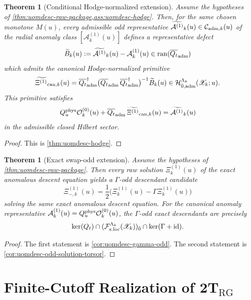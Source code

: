 \documentclass[11pt]{article}
\theoremstyle{definition}
\theoremstyle{plain}
\newtheorem{theorem}[definition]{Theorem}
\theoremstyle{remark}
\newcommand{\Fsloc}{\mathcal F_{\rm s.loc}}
\newcommand{\Xscr}{\mathscr X}
\newcommand{\Ozero}{\mathcal O^{(0)}}
\newcommand{\Aone}{\mathcal A^{(1)}}
\newcommand{\Xione}{\Xi^{(1)}}
\newcommand{\Qt}{Q_t}
\newcommand{\Quphys}{Q_u^{\rm phys}}
\newcommand{\id}{\mathrm{id}}
\begin{document}
\begin{theorem}[Conditional Hodge-normalized extension]
\label{thm:uomdesc-conditional-hodge-package}
Assume the hypotheses of \cref{thm:uomdesc-raw-package,ass:uomdesc-hodge}.
Then, for the same chosen monotone \(M(u)\), every admissible odd representative
\(
\widetilde{\Aone}_k(u)\in\mathcal C_{{\rm adm},k}(u)
\)
of the radial anomaly class \([\Aone_k(u)]\) defines a representative defect
\[
\widetilde{B}_k(u):=\widetilde{\Aone}_k(u)-\Aone_k(u)\in \mathrm{ran}(\overline{\Qt}_{\rm adm})
\]
which admits the canonical Hodge-normalized primitive
\[
\widetilde{\Xione}_{{\rm can},k}(u)
=
\overline{\Qt}_{\rm adm}^{\dagger}
\big(\overline{\Qt}_{\rm adm}\,\overline{\Qt}_{\rm adm}^{\dagger}\big)^{-1}
\widetilde{B}_k(u)
\in
\mathcal H_{\bar 0,{\rm adm}}^{\Lambda_k}(\Xscr_k;u).
\]
This primitive satisfies
\[
\Quphys\Ozero_k(u)+\overline{\Qt}_{\rm adm}\,\widetilde{\Xione}_{{\rm can},k}(u)
=
\widetilde{\Aone}_k(u)
\]
in the admissible closed Hilbert sector.
\end{theorem}

\begin{proof}
This is \cref{thm:uomdesc-hodge}.
\end{proof}

\begin{theorem}[Exact swap-odd extension]
\label{thm:uomdesc-conditional-odd-package}
Assume the hypotheses of \cref{thm:uomdesc-raw-package}.
Then every raw solution \(\Xione_k(u)\) of the exact anomalous descent equation yields a
\(\Gamma\)-odd descendant candidate
\[
\Xione_{-,k}(u)=\frac12\big(\Xione_k(u)-\Gamma\Xione_k(u)\big)
\]
solving the same exact anomalous descent equation.
For the canonical anomaly representative \(\Aone_k(u)=\Quphys\Ozero_k(u)\), the \(\Gamma\)-odd
exact descendants are precisely
\[
\ker(\Qt)\cap(\Fsloc^{\Lambda_k}(\Xscr_k))_{\bar 0}\cap\ker(\Gamma+\id).
\]
\end{theorem}

\begin{proof}
The first statement is \cref{cor:uomdesc-gamma-odd}.
The second statement is \cref{cor:uomdesc-odd-solution-torsor}.
\end{proof}

\section[Finite-Cutoff Realization of 2T RG]{Finite-Cutoff Realization of \texorpdfstring{\(\mathbf{2T}_{\mathrm{RG}}\)}{2T RG}}
\label{sec:uomdesc-2trg}
\end{document}
